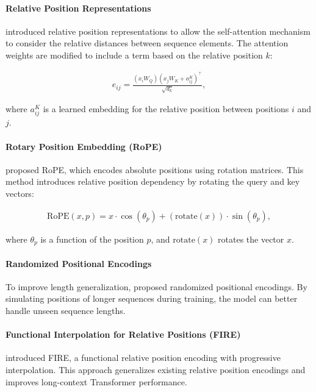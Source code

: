 \paragraph{Relative Position Representations}

\textcite{shaw_self-attention_2018} introduced relative position representations to allow the self-attention mechanism to consider the relative distances between sequence elements. The attention weights are modified to include a term based on the relative position $k$:

\begin{align}
    e_{ij} = \frac{(x_i W_Q)(x_j W_K + a_{ij}^K)^\top}{\sqrt{d_k}},
\end{align}

where $a_{ij}^K$ is a learned embedding for the relative position between positions $i$ and $j$.

\paragraph{Rotary Position Embedding (RoPE)}

\textcite{su_roformer_2024} proposed RoPE, which encodes absolute positions using rotation matrices. This method introduces relative position dependency by rotating the query and key vectors:

\begin{align}
    \text{RoPE}(x, p) = x \cdot \cos(\theta_p) + (\text{rotate}(x)) \cdot \sin(\theta_p),
\end{align}

where $\theta_p$ is a function of the position $p$, and $\text{rotate}(x)$ rotates the vector $x$.

\paragraph{Randomized Positional Encodings}

To improve length generalization, \textcite{ruoss_randomized_2023} proposed randomized positional encodings. By simulating positions of longer sequences during training, the model can better handle unseen sequence lengths.

\paragraph{Functional Interpolation for Relative Positions (FIRE)}

\textcite{li_functional_2024} introduced FIRE, a functional relative position encoding with progressive interpolation. This approach generalizes existing relative position encodings and improves long-context Transformer performance.

